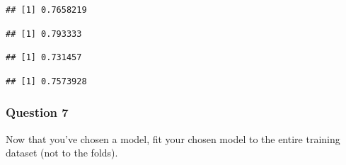 \documentclass[
]{article}
\newenvironment{Shaded}{\begin{snugshade}}{\end{snugshade}}
\newcommand{\CommentTok}[1]{\textcolor[rgb]{0.56,0.35,0.01}{\textit{#1}}}
\newcommand{\DecValTok}[1]{\textcolor[rgb]{0.00,0.00,0.81}{#1}}
\newcommand{\FunctionTok}[1]{\textcolor[rgb]{0.00,0.00,0.00}{#1}}
\newcommand{\NormalTok}[1]{#1}
\newcommand{\OtherTok}[1]{\textcolor[rgb]{0.56,0.35,0.01}{#1}}
\newcommand{\SpecialCharTok}[1]{\textcolor[rgb]{0.00,0.00,0.00}{#1}}
\begin{document}
\begin{verbatim}
## [1] 0.7658219
\end{verbatim}

\begin{Shaded}
\end{Shaded}

\begin{verbatim}
## [1] 0.793333
\end{verbatim}

\begin{Shaded}
\end{Shaded}

\begin{verbatim}
## [1] 0.731457
\end{verbatim}

\begin{Shaded}
\end{Shaded}

\begin{verbatim}
## [1] 0.7573928
\end{verbatim}

\hypertarget{question-7}{%
\subsubsection{Question 7}\label{question-7}}

Now that you've chosen a model, fit your chosen model to the entire
training dataset (not to the folds).
\end{document}
